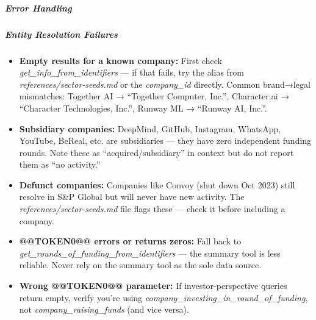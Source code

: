 \documentclass[11pt]{article}
\begin{document}
\subparagraph{Error Handling}\mbox{}\par

\subparagraph{Entity Resolution Failures}\mbox{}\par
\begin{itemize}[leftmargin=*,itemsep=2pt,topsep=2pt]
\item {} \textbf{Empty results for a known company:} First check \emph{get\_\allowbreak{}info\_\allowbreak{}from\_\allowbreak{}identifiers} — if that fails, try the alias from \emph{references/sector-seeds.md} or the \emph{company\_\allowbreak{}id} directly. Common brand→legal mismatches: Together AI → ``Together Computer, Inc.'', Character.ai → ``Character Technologies, Inc.'', Runway ML → ``Runway AI, Inc.''.
\item {} \textbf{Subsidiary companies:} DeepMind, GitHub, Instagram, WhatsApp, YouTube, BeReal, etc. are subsidiaries — they have zero independent funding rounds. Note these as ``acquired/subsidiary'' in context but do not report them as ``no activity.''
\item {} \textbf{Defunct companies:} Companies like Convoy (shut down Oct 2023) still resolve in S\&P Global but will never have new activity. The \emph{references/sector-seeds.md} file flags these — check it before including a company.
\item {} \textbf{@@TOKEN0@@ errors or returns zeros:} Fall back to \emph{get\_\allowbreak{}rounds\_\allowbreak{}of\_\allowbreak{}funding\_\allowbreak{}from\_\allowbreak{}identifiers} — the summary tool is less reliable. Never rely on the summary tool as the sole data source.
\item {} \textbf{Wrong @@TOKEN0@@ parameter:} If investor-perspective queries return empty, verify you're using \emph{company\_\allowbreak{}investing\_\allowbreak{}in\_\allowbreak{}round\_\allowbreak{}of\_\allowbreak{}funding}, not \emph{company\_\allowbreak{}raising\_\allowbreak{}funds} (and vice versa).
\end{itemize}
\end{document}
